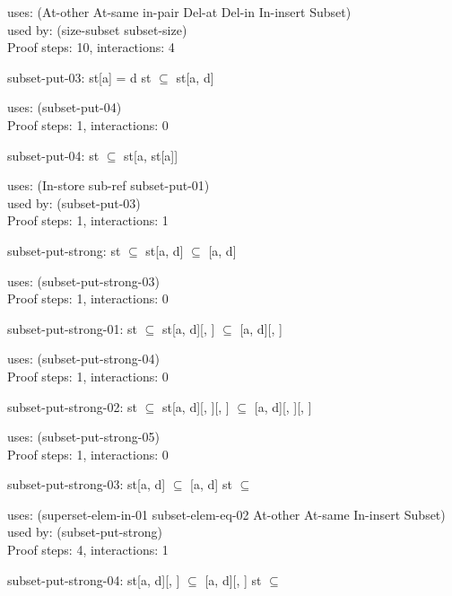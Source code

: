 \documentclass[a4paper]{article}
\begin{document}
uses: (At-other At-same in-pair Del-at Del-in In-insert Subset)\\
used by: (size-subset subset-size)\\
Proof steps: 10, interactions: 4

\medskip

subset-put-03: 
 \Fol st[a] = d \Imp st $\subseteq$ st[a, d]


uses: (subset-put-04)\\
Proof steps: 1, interactions: 0

\medskip

subset-put-04: 
 \Fol st $\subseteq$ st[a, st[a]]


uses: (In-store sub-ref subset-put-01)\\
used by: (subset-put-03)\\
Proof steps: 1, interactions: 1

\medskip

subset-put-strong: 
 \Fol st $\subseteq$  \Imp st[a, d] $\subseteq$ [a, d]


uses: (subset-put-strong-03)\\
Proof steps: 1, interactions: 0

\medskip

subset-put-strong-01: 
 \Fol st $\subseteq$  \Imp st[a, d][, ] $\subseteq$ [a, d][, ]


uses: (subset-put-strong-04)\\
Proof steps: 1, interactions: 0

\medskip

subset-put-strong-02: 
 \Fol st $\subseteq$  \Imp st[a, d][, ][, ] $\subseteq$ [a, d][, ][, ]


uses: (subset-put-strong-05)\\
Proof steps: 1, interactions: 0

\medskip

subset-put-strong-03: 
 \Fol \Not st[a, d] $\subseteq$ [a, d] \Imp \Not st $\subseteq$ 


uses: (superset-elem-in-01 subset-elem-eq-02 At-other At-same In-insert
       Subset)\\
used by: (subset-put-strong)\\
Proof steps: 4, interactions: 1

\medskip

subset-put-strong-04: 
 \Fol \Not st[a, d][, ] $\subseteq$ [a, d][, ] \Imp \Not st $\subseteq$ 
\end{document}
